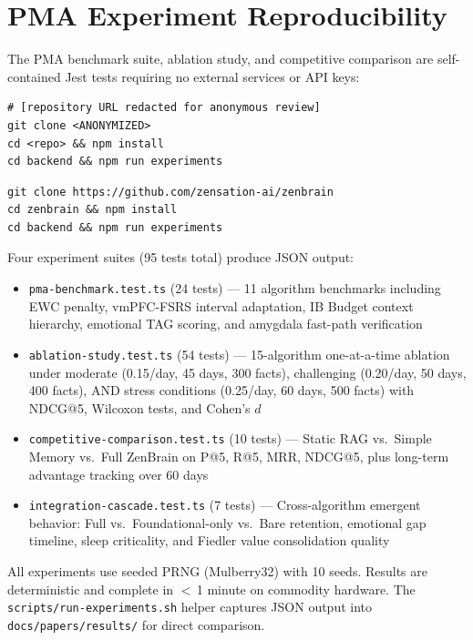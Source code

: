 \documentclass{article}
\begin{document}
\section{PMA Experiment Reproducibility}
\label{app:reproducibility-v6}

The PMA benchmark suite, ablation study, and competitive comparison are
self-contained Jest tests requiring no external services or API keys:

\makeatletter
\if@anonymous
\begin{verbatim}
# [repository URL redacted for anonymous review]
git clone <ANONYMIZED>
cd <repo> && npm install
cd backend && npm run experiments
\end{verbatim}
\else
\begin{verbatim}
git clone https://github.com/zensation-ai/zenbrain
cd zenbrain && npm install
cd backend && npm run experiments
\end{verbatim}
\fi
\makeatother

Four experiment suites (95 tests total) produce JSON output:
\begin{itemize}
    \item \texttt{pma-benchmark.test.ts} (24 tests) --- 11 algorithm benchmarks
    including EWC penalty, vmPFC-FSRS interval adaptation, IB Budget context hierarchy,
    emotional TAG scoring, and amygdala fast-path verification
    \item \texttt{ablation-study.test.ts} (54 tests) --- 15-algorithm one-at-a-time ablation
    under moderate (0.15/day, 45 days, 300 facts), challenging (0.20/day, 50 days,
    400 facts), AND stress conditions (0.25/day, 60 days, 500 facts) with NDCG@5,
    Wilcoxon tests, and Cohen's $d$
    \item \texttt{competitive-comparison.test.ts} (10 tests) --- Static RAG vs.\ Simple Memory
    vs.\ Full ZenBrain on P@5, R@5, MRR, NDCG@5, plus long-term advantage tracking
    over 60 days
    \item \texttt{integration-cascade.test.ts} (7 tests) --- Cross-algorithm emergent
    behavior: Full vs.\ Foundational-only vs.\ Bare retention, emotional gap timeline,
    sleep criticality, and Fiedler value consolidation quality
\end{itemize}

All experiments use seeded PRNG (Mulberry32) with 10 seeds.
Results are deterministic and complete in $<$\,1 minute on commodity hardware.
The \texttt{scripts/run-experiments.sh} helper captures JSON output into
\texttt{docs/papers/results/} for direct comparison.
\end{document}

